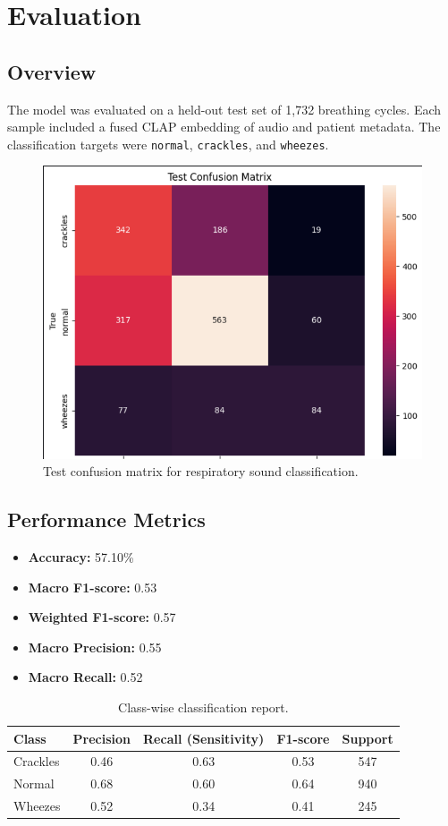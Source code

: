 \break
\section{Evaluation}

\subsection*{Overview}
The model was evaluated on a held-out test set of 1,732 breathing cycles. Each sample included a fused CLAP embedding of audio and patient metadata. The classification targets were \texttt{normal}, \texttt{crackles}, and \texttt{wheezes}.

\begin{figure}[htbp]
    \centering
    \includegraphics[width=0.7\linewidth]{Chapter4/pic.png}
    \caption{Test confusion matrix for respiratory sound classification.}
    \label{fig:confusion-matrix}
\end{figure}

\subsection{Performance Metrics}
\begin{itemize}
    \item \textbf{Accuracy:} 57.10\%
    \item \textbf{Macro F1-score:} 0.53
    \item \textbf{Weighted F1-score:} 0.57
    \item \textbf{Macro Precision:} 0.55
    \item \textbf{Macro Recall:} 0.52
\end{itemize}

\begin{table}[htbp]
\centering
\begin{tabular}{|l|c|c|c|c|}
\hline
\textbf{Class} & \textbf{Precision} & \textbf{Recall (Sensitivity)} & \textbf{F1-score} & \textbf{Support} \\
\hline
Crackles & 0.46 & 0.63 & 0.53 & 547 \\
Normal   & 0.68 & 0.60 & 0.64 & 940 \\
Wheezes  & 0.52 & 0.34 & 0.41 & 245 \\
\hline
\end{tabular}
\caption{Class-wise classification report.}
\end{table}

